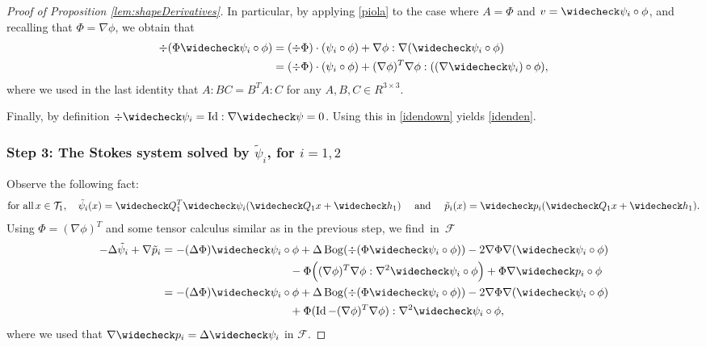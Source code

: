 \documentclass[JEP,XML,SOM,Unicode, NoEqCountersInSection,NoFloatCountersInSection,published]{cedram}
\DeclareMathOperator{\Bog}{Bog}
\DeclareMathOperator{\Id}{Id}
\theoremstyle{definition}
\theoremstyle{remark}
\begin{document}
\begin{proof}[Proof of Proposition \ref{lem:shapeDerivatives}]
In particular, by applying \eqref{piola} to the case where $A= \Phi$ and $v= \widecheck \psi_i \circ \phi$, and recalling that $\Phi = \nabla \phi$, we obtain that
\begin{equation}
\begin{aligned}
\div (\Phi \widecheck \psi_i \circ \phi) &=
(\div \Phi) \cdot (\psi_i \circ \phi) +
\nabla \phi : \nabla (\widecheck \psi_i \circ \phi) \\
&= (\div \Phi) \cdot (\psi_i \circ \phi) +
(\nabla \phi)^T \nabla \phi : ((\nabla \widecheck \psi_i) \circ \phi), \label{idendown}
\end{aligned}
\end{equation}
where we used in the last identity that $A:BC = B^T A : C$ for any $A,B,C \in R^{3 \times 3}$.

Finally, by definition $\div \widecheck \psi_i = \Id : \nabla \widecheck \psi = 0$. Using this in \eqref{idendown} yields \eqref{idenden}.

\subsubsection*{Step 3: The Stokes system solved by $\tilde \psi_i$, for $i=1,2$}
Observe the following fact:
\begin{equation} \label{soliv-tout}
\text{for all} \, x \in \mathcal T_1, \quad
\tilde \psi_i (x) = \widecheck Q_1^T \widecheck \psi_i (\widecheck Q_1 x + \widecheck h_1)
\quad \text{ and } \quad
\tilde p_i(x) = \widecheck p_i (\widecheck Q_1 x + \widecheck h_1).
\end{equation}
Using $\Phi \!=\! (\nabla \phi)^T$ and some tensor calculus similar as in the previous step, we find~in~$\mathcal F$
\begin{align*}
- \Delta \tilde \psi_i + \nabla \tilde p_i &= - (\Delta \Phi) \widecheck \psi_i \circ \phi + \Delta \Bog (\div (\Phi \widecheck \psi_i \circ \phi))
- 2 \nabla \Phi \nabla (\widecheck \psi_i \circ \phi) \\
& \hspace*{4cm}-\Phi \Big((\nabla \phi)^T \nabla \phi : \nabla^2 \widecheck \psi_i \circ \phi \Big) + \Phi \nabla \widecheck p_i \circ \phi \\
& = -(\Delta \Phi) \widecheck \psi_i \circ \phi + \Delta \Bog (\div (\Phi \widecheck \psi_i \circ \phi)) - 2 \nabla \Phi \nabla (\widecheck \psi_i \circ \phi) \\
&\hspace*{4cm}+ \Phi (\Id - (\nabla \phi)^T\nabla \phi) : \nabla^2 \widecheck \psi_i \circ \phi,
\end{align*}
where we used that $ \nabla \widecheck p_i = \Delta \widecheck \psi_i$ in $\mathcal F$.


\end{proof}
\end{document}
